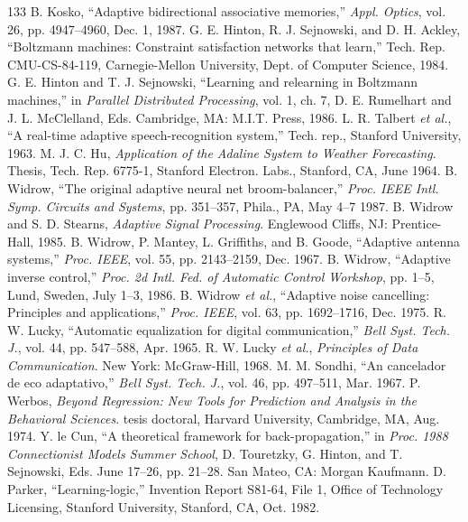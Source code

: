 \documentclass[10pt,twocolumn]{article}
\begin{document}
\begin{thebibliography}{133}
 B. Kosko, ``Adaptive bidirectional associative memories,'' \textit{Appl. Optics}, vol. 26, pp. 4947--4960, Dec. 1, 1987.
 G. E. Hinton, R. J. Sejnowski, and D. H. Ackley, ``Boltzmann machines: Constraint satisfaction networks that learn,'' Tech. Rep. CMU-CS-84-119, Carnegie-Mellon University, Dept. of Computer Science, 1984.
 G. E. Hinton and T. J. Sejnowski, ``Learning and relearning in Boltzmann machines,'' in \textit{Parallel Distributed Processing}, vol. 1, ch. 7, D. E. Rumelhart and J. L. McClelland, Eds. Cambridge, MA: M.I.T. Press, 1986.
 L. R. Talbert \textit{et al.}, ``A real-time adaptive speech-recognition system,'' Tech. rep., Stanford University, 1963.
 M. J. C. Hu, \textit{Application of the Adaline System to Weather Forecasting}. Thesis, Tech. Rep. 6775-1, Stanford Electron. Labs., Stanford, CA, June 1964.
 B. Widrow, ``The original adaptive neural net broom-balancer,'' \textit{Proc. IEEE Intl. Symp. Circuits and Systems}, pp. 351--357, Phila., PA, May 4--7 1987.
 B. Widrow and S. D. Stearns, \textit{Adaptive Signal Processing}. Englewood Cliffs, NJ: Prentice-Hall, 1985.
 B. Widrow, P. Mantey, L. Griffiths, and B. Goode, ``Adaptive antenna systems,'' \textit{Proc. IEEE}, vol. 55, pp. 2143--2159, Dec. 1967.
 B. Widrow, ``Adaptive inverse control,'' \textit{Proc. 2d Intl. Fed. of Automatic Control Workshop}, pp. 1--5, Lund, Sweden, July 1--3, 1986.
 B. Widrow \textit{et al.}, ``Adaptive noise cancelling: Principles and applications,'' \textit{Proc. IEEE}, vol. 63, pp. 1692--1716, Dec. 1975.
 R. W. Lucky, ``Automatic equalization for digital communication,'' \textit{Bell Syst. Tech. J.}, vol. 44, pp. 547--588, Apr. 1965.
 R. W. Lucky \textit{et al.}, \textit{Principles of Data Communication}. New York: McGraw-Hill, 1968.
 M. M. Sondhi, ``An cancelador de eco adaptativo,'' \textit{Bell Syst. Tech. J.}, vol. 46, pp. 497--511, Mar. 1967.
 P. Werbos, \textit{Beyond Regression: New Tools for Prediction and Analysis in the Behavioral Sciences}. tesis doctoral, Harvard University, Cambridge, MA, Aug. 1974.
 Y. le Cun, ``A theoretical framework for back-propagation,'' in \textit{Proc. 1988 Connectionist Models Summer School}, D. Touretzky, G. Hinton, and T. Sejnowski, Eds. June 17--26, pp. 21--28. San Mateo, CA: Morgan Kaufmann.
 D. Parker, ``Learning-logic,'' Invention Report S81-64, File 1, Office of Technology Licensing, Stanford University, Stanford, CA, Oct. 1982.

\end{thebibliography}
\end{document}

